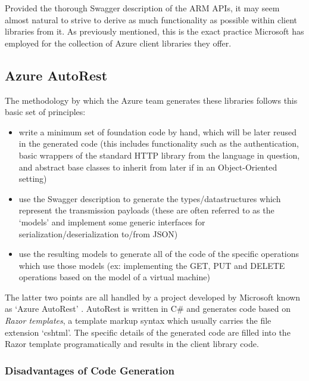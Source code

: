 \documentclass[11pt]{report}
\begin{document}
Provided the thorough Swagger description of the ARM APIs, it may seem almost
natural to strive to derive as much functionality as possible within client
libraries from it. As previously mentioned, this is the exact practice
Microsoft has employed for the collection of Azure client libraries they offer.

\subsection{Azure AutoRest}

The methodology by which the Azure team generates these libraries follows this
basic set of principles:

\begin{itemize}
    \item{} write a minimum set of foundation code by hand, which will be later
        reused in the generated code (this includes functionality such as the
        authentication, basic wrappers of the standard HTTP library from the
        language in question, and abstract base classes to inherit from later if
        in an Object-Oriented setting)
    \item{} use the Swagger description to generate the types/datastructures
        which represent the transmission payloads (these are often referred to
        as the `models' and implement some generic interfaces for
        serialization/deserialization to/from JSON)
    \item{} use the resulting models to generate all of the code of the
        specific operations which use those models (ex: implementing the
        GET, PUT and DELETE operations based on the model of a virtual machine)
\end{itemize}

The latter two points are all handled by a project developed by Microsoft known
as `Azure AutoRest' \cite{azureAutoRest}. AutoRest is written in C\# and
generates code based on \textit{Razor templates}, a template markup syntax
which usually carries the file extension `cshtml'. The specific details of the
generated code are filled into the Razor template programatically and results
in the client library code.

\subsubsection{Disadvantages of Code Generation}
\end{document}

